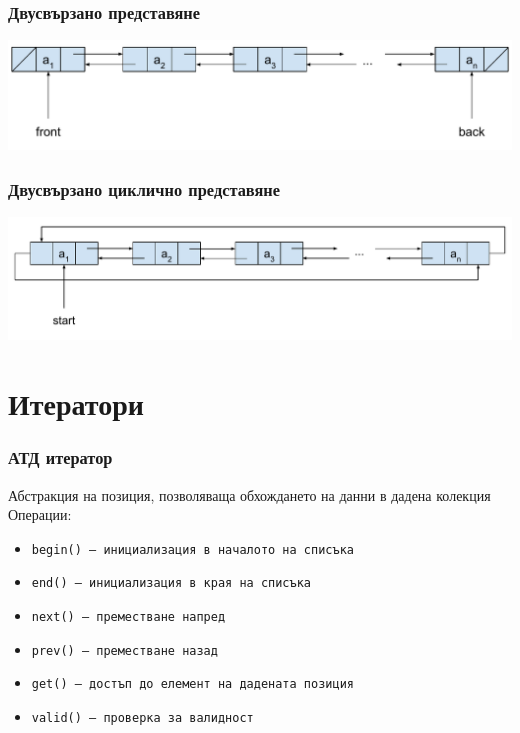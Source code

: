 \documentclass[alsotrans]{beamerswitch}
\begin{document}
\begin{frame}[label=doublelinked]
  \frametitle{Двусвързано представяне}

  \begin{center}
    \includegraphics[width=\textwidth]{images/double_linked_list.pdf}
  \end{center}
\end{frame}

\begin{frame}
  \frametitle{Двусвързано циклично представяне}

  \begin{center}
    \includegraphics[width=\textwidth]{images/double_linked_cyclic_list.pdf}
  \end{center}
\end{frame}

\section{Итератори}

\begin{frame}
  \frametitle{АТД итератор}

  Абстракция на позиция, позволяваща обхождането на данни в дадена колекция\\[2ex]
  Операции:\\[1ex]
  \begin{itemize}
  \item \tt{begin()} -- инициализация в началото на списъка
  \item \tt{end()} -- инициализация в края на списъка
  \item \tt{next()} -- преместване напред
  \item \tt{prev()} -- преместване назад
  \item \tt{get()} -- достъп до елемент на дадената позиция
  \item \tt{valid()} -- проверка за валидност
  \end{itemize}
\end{frame}
\end{document}
